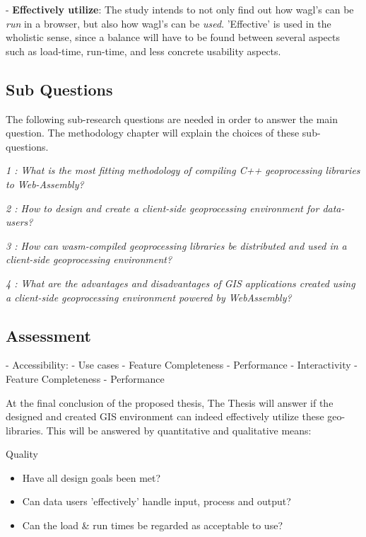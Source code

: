- \textbf{Effectively utilize}: The study intends to not only find out how wagl's can be \textit{run} in a browser, but also how wagl's can be \textit{used}. 'Effective' is used in the wholistic sense, since a balance will have to be found between several aspects such as load-time, run-time, and less concrete usability aspects. 


\subsection*{Sub Questions}

The following sub-research questions are needed in order to answer the main question. The methodology chapter will explain the choices of these sub-questions. 


\textit{1 : What is the most fitting methodology of compiling C++ geoprocessing   libraries to Web-Assembly?}

\textit{2 : How to design and create a client-side geoprocessing environment for data-users?}

\textit{3 : How can wasm-compiled geoprocessing libraries be distributed and used in a client-side geoprocessing environment?}

\textit{4 : What are the advantages and disadvantages of GIS applications created using a client-side geoprocessing environment powered by WebAssembly?}

\newpage
\subsection*{Assessment}

- Accessibility: 
  - Use cases
    - Feature Completeness 
    - Performance
- Interactivity 
  - Feature Completeness 
  - Performance


At the final conclusion of the proposed thesis, The Thesis will answer if the designed and created GIS environment can indeed effectively utilize these geo-libraries.
This will be answered by quantitative and qualitative means:

Quality
\begin{itemize}
    \item Have all design goals been met?
    \item Can data users 'effectively' handle input, process and output?
    \item Can the load \& run times be regarded as acceptable to use? 
\end{itemize} 


